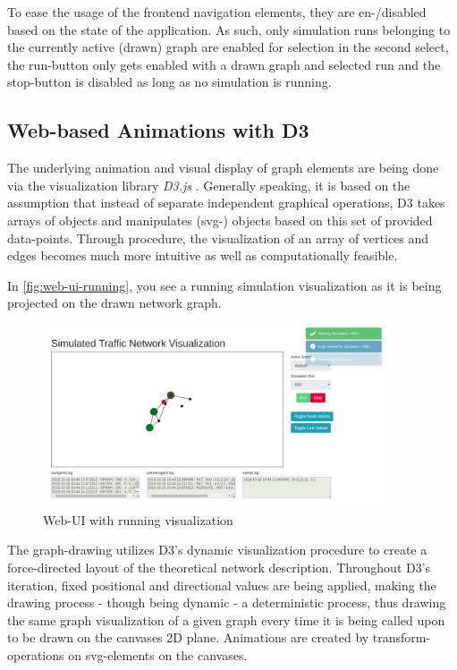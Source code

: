 To ease the usage of the frontend navigation elements, they are en-/disabled based on the state of the application. As such, only simulation runs belonging to the currently active (drawn) graph are enabled for selection in the second select, the run-button only gets enabled with a drawn graph and selected run and the stop-button is disabled as long as no simulation is running.


\subsection{Web-based Animations with D3}\label{subsec:d3}

The underlying animation and visual display of graph elements are being done via the visualization library \textit{D3.js} \cite{bostock2012d3}.
Generally speaking, it is based on the assumption that instead of separate independent graphical operations, D3 takes arrays of objects and manipulates (svg-) objects based on this set of provided data-points. Through procedure, the visualization of an array of vertices and edges becomes much more intuitive as well as computationally feasible.

In \autoref{fig:web-ui-running}, you see a running simulation visualization as it is being projected on the drawn network graph.

\begin{figure}
    \centering
    \includegraphics[width=0.9\textwidth]{images/web-ui-running.png}
    \caption{Web-UI with running visualization}
    \label{fig:web-ui-running}
\end{figure}

The graph-drawing utilizes D3's dynamic visualization procedure to create a force-directed layout of the theoretical network description. Throughout D3's iteration, fixed positional and directional values are being applied, making the drawing process - though being dynamic - a deterministic process, thus drawing the same graph visualization of a given graph every time it is being called upon to be drawn on the canvases 2D plane.
Animations are created by transform-operations on svg-elements on the canvases.

